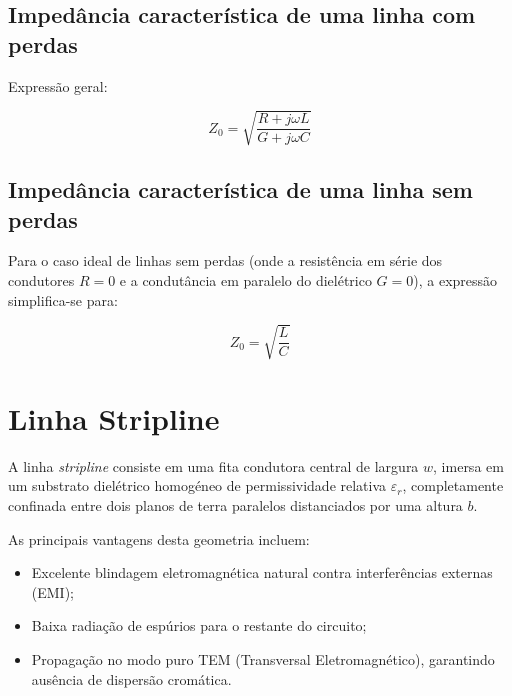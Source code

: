 \documentclass[12pt,a4paper]{report}
\begin{document}
\newpage

\subsection{Impedância característica de uma linha com perdas}

Expressão geral:

\begin{equation}
\boxed{
Z_0 = \sqrt{\frac{R+j\omega L}{G+j\omega C}}
}
\end{equation}

\subsection{Impedância característica de uma linha sem perdas}

Para o caso ideal de linhas sem perdas (onde a resistência em série dos condutores $R=0$ e a condutância em paralelo do dielétrico $G=0$), a expressão simplifica-se para:

\begin{equation}
\boxed{
Z_0 = \sqrt{\frac{L}{C}}
}
\end{equation}

\newpage


\section{Linha Stripline}

A linha \textit{stripline} consiste em uma fita condutora central de largura $w$, imersa em um substrato dielétrico homogéneo de permissividade relativa $\varepsilon_r$, completamente confinada entre dois planos de terra paralelos distanciados por uma altura $b$.

As principais vantagens desta geometria incluem:

\begin{itemize}
    \item Excelente blindagem eletromagnética natural contra interferências externas (EMI);
    \item Baixa radiação de espúrios para o restante do circuito;
    \item Propagação no modo puro TEM (Transversal Eletromagnético), garantindo ausência de dispersão cromática.
\end{itemize}
\end{document}
